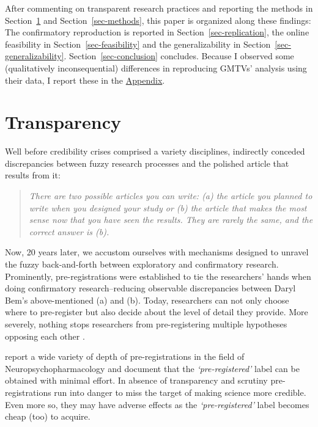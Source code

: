 \documentclass[
  authoryear,
  review,
  3p,
  onecolumn]{elsarticle}
\begin{document}
After commenting on transparent research practices and reporting the
methods in Section~\ref{sec-transparency} and Section~\ref{sec-methods},
this paper is organized along these findings: The confirmatory
reproduction is reported in Section~\ref{sec-replication}, the online
feasibility in Section~\ref{sec-feasibility} and the generalizability in
Section~\ref{sec-generalizability}. Section~\ref{sec-conclusion}
concludes. Because I observed some (qualitatively inconsequential)
differences in reproducing GMTVs' analysis using their data, I report
these in the \href{@sec-appendix}{Appendix}.

\hypertarget{sec-transparency}{%
\section{Transparency}\label{sec-transparency}}

Well before credibility crises comprised a variety disciplines,
\citet[p.~2]{bemwriting} indirectly conceded discrepancies between fuzzy
research processes and the polished article that results from it:

\begin{quote}
\emph{There are two possible articles you can write: (a) the article you
planned to write when you designed your study or (b) the article that
makes the most sense now that you have seen the results. They are rarely
the same, and the correct answer is (b).}
\end{quote}

Now, 20 years later, we accustom ourselves with mechanisms designed to
unravel the fuzzy back-and-forth between exploratory and confirmatory
research. Prominently, pre-registrations were established to tie the
researchers' hands when doing confirmatory research--reducing observable
discrepancies between Daryl Bem's above-mentioned (a) and (b). Today,
researchers can not only choose where to pre-register but also decide
about the level of detail they provide. More severely, nothing stops
researchers from pre-registering multiple hypotheses opposing each other
\citetext{\citealp[see, e.g.,][]{SimmonsEtAl2021}; \citealp[and][ for a
discussion]{PhamEtAl2021}}.

\citet{WaldronAllen2022} report a wide variety of depth of
pre-registrations in the field of Neuropsychopharmacology and document
that the \emph{`pre-registered'} label can be obtained with minimal
effort. In absence of transparency and scrutiny pre-registrations run
into danger to miss the target of making science more credible. Even
more so, they may have adverse effects as the \emph{`pre-registered'}
label becomes cheap (too) to acquire.
\end{document}
